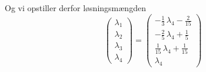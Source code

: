 \documentclass[a4paper,fleqn]{article}
\begin{document}
	Og vi opstiller derfor løsningsmængden
	\[\begin{pmatrix}\lambda_1\\\lambda_2\\\lambda_3\\\lambda_4\end{pmatrix} =
		\begin{pmatrix}
			-\frac{1}{3} \, \lambda_4 - \frac{2}{15} \\
			-\frac{2}{5} \, \lambda_4 + \frac{1}{5} \\
			\frac{1}{15} \, \lambda_4 + \frac{1}{15} \\
			\lambda_4
		\end{pmatrix}
	\]

\end{document}
